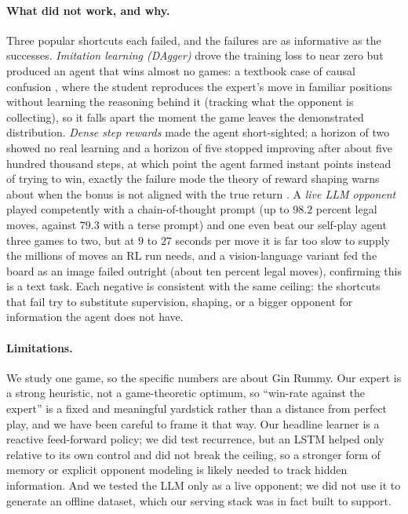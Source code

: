 \documentclass[letterpaper]{article} %
\begin{document}
\paragraph{What did not work, and why.}
Three popular shortcuts each failed, and the failures are as informative as the
successes. \emph{Imitation learning (DAgger)} drove the training loss to near zero
but produced an agent that wins almost no games: a textbook case of causal
confusion \citep{causalconfusion}, where the student reproduces the expert's move
in familiar positions without learning the reasoning behind it (tracking what the
opponent is collecting), so it falls apart the moment the game leaves the
demonstrated distribution. \emph{Dense step rewards} made the agent short-sighted;
a horizon of two showed no real learning and a horizon of five stopped improving
after about five hundred thousand steps, at which point the agent farmed instant
points instead of trying to win, exactly the failure mode the theory of reward
shaping warns about when the bonus is not aligned with the true return
\citep{shaping}. A \emph{live LLM opponent} played competently with a
chain-of-thought prompt (up to $98.2$ percent legal moves, against $79.3$ with a
terse prompt) and one even beat our self-play agent three games to two, but at $9$
to $27$ seconds per move it is far too slow to supply the millions of moves an RL
run needs, and a vision-language variant fed the board as an image failed outright
(about ten percent legal moves), confirming this is a text task. Each negative is
consistent with the same ceiling: the shortcuts that fail try to substitute
supervision, shaping, or a bigger opponent for information the agent does not have.

\paragraph{Limitations.}
We study one game, so the specific numbers are about Gin Rummy. Our expert is a
strong heuristic, not a game-theoretic optimum, so ``win-rate against the
expert'' is a fixed and meaningful yardstick rather than a distance from perfect
play, and we have been careful to frame it that way. Our headline learner is a
reactive feed-forward policy; we did test recurrence, but an LSTM helped only
relative to its own control and did not break the ceiling, so a stronger form of
memory or explicit opponent modeling is likely needed to track hidden
information. And we tested the LLM only as a live opponent; we did not use it to
generate an offline dataset, which our serving stack was in fact built to
support.
\end{document}
